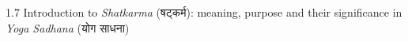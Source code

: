 





\begin{frame}[fragile]\frametitle{}
\begin{center}
{\Large 1.7 Introduction to \textit{Shatkarma} (षट्कर्म): meaning, purpose and their significance in \textit{Yoga Sadhana} (योग साधना)}
\end{center}
\end{frame}





